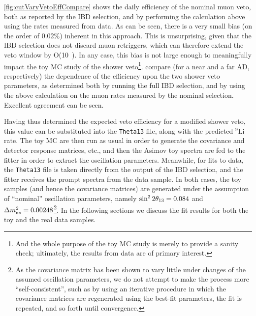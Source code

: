 \documentclass[../thesis.tex]{subfiles}
\begin{document}
\autoref{fig:cutVaryVetoEffCompare} shows the daily efficiency of the nominal muon veto, both as reported by the IBD selection, and by performing the calculation above using the rates measured from data. As can be seen, there is a very small bias (on the order of 0.02\%) inherent in this approach. This is unsurprising, given that the IBD selection does not discard muon retriggers, which can therefore extend the veto window by O(10~\us). In any case, this bias is not large enough to meaningfully impact the toy MC study of the shower veto\footnote{And the whole purpose of the toy MC study is merely to provide a sanity check; ultimately, the results from data are of primary interest.}.  compare (for a near and a far AD, respectively) the dependence of the efficiency upon the two shower veto parameters, as determined both by running the full IBD selection, and by using the above calculation on the muon rates measured by the nominal selection. Excellent agreement can be seen.

Having thus determined the expected veto efficiency for a modified shower veto, this value can be substituted into the \texttt{Theta13} file, along with the predicted $^9$Li rate. The toy MC are then run as usual in order to generate the covariance and detector response matrices, etc., and then the Asimov toy spectra are fed to the fitter in order to extract the oscillation parameters. Meanwhile, for fits to data, the \texttt{Theta13} file is taken directly from the output of the IBD selection, and the fitter receives the prompt spectra from the data sample. In both cases, the toy samples (and hence the covariance matrices) are generated under the assumption of ``nominal'' oscillation parameters, namely $\sin^2 2\theta_{13} = 0.084$ and $\Delta m^2_{ee} = 0.00248$\footnote{As the covariance matrix has been shown to vary little under changes of the assumed oscillation parameters, we do not attempt to make the process more ``self-consistent'', such as by using an iterative procedure in which the covariance matrices are regenerated using the best-fit parameters, the fit is repeated, and so forth until convergence.}. In the following sections we discuss the fit results for both the toy and the real data samples.

\begin{comment}
Regarding results: Don't comment on ``structure'' until we've regenerated the 2D plots using the fix to SinglesCalc::calcSinglesHz. (Accidentals rate might have been biased, throwing off the fit.)
\end{comment}
\end{document}
